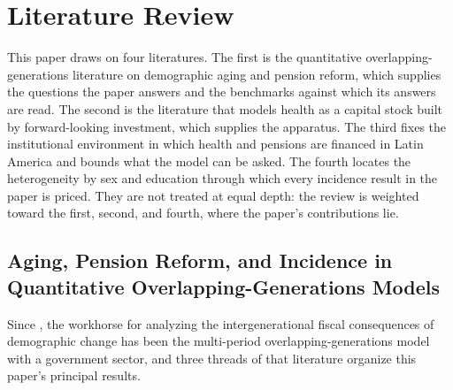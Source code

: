 \documentclass[12pt,a4paper]{article}
\begin{document}
\section{Literature Review}
\label{sec:lit}

This paper draws on four literatures. The first is the quantitative
overlapping-generations literature on demographic aging and pension reform,
which supplies the questions the paper answers and the benchmarks against which
its answers are read. The second is the literature that models health as a
capital stock built by forward-looking investment, which supplies the apparatus.
The third fixes the institutional environment in which health and pensions are
financed in Latin America and bounds what the model can be asked. The fourth
locates the heterogeneity by sex and education through which every incidence
result in the paper is priced. They are not treated at equal depth: the review
is weighted toward the first, second, and fourth, where the paper's
contributions lie.

\subsection{Aging, Pension Reform, and Incidence in Quantitative Over\-lapping-Generations Models}
\label{subsec:lit_pension}

Since \citet{AuerbachKotlikoff1987}, the workhorse for analyzing the
intergenerational fiscal consequences of demographic change has been the
multi-period overlapping-generations model with a government sector, and three
threads of that literature organize this paper's principal results.
\end{document}
